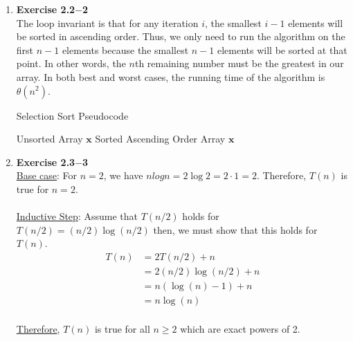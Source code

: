 \documentclass[a4paper,11pt,oneside]{book}
\begin{document}
\noindent{}
\normalsize

\begin{enumerate}
  \item {\textbf{Exercise 2.2$-$2}} 
  \\ The loop invariant is that for any iteration $i$, the smallest $i-1$ elements
  will be sorted in ascending order. Thus, we only need to run the algorithm on the first $n-1$
  elements because the smallest $n-1$ elements will be sorted at that point. In other words, the $n$th 
  remaining number must be the greatest in our array. In both best and worst cases, the running time of the
  algorithm is $\theta(n^2)$.
\begin{algorithm}
    \caption{Selection Sort Pseudocode}
    \begin{algorithmic}[1]
        \Require Unsorted Array $\mathbf{x}$
        \Ensure Sorted Ascending Order Array $\mathbf{x}$
        \Statex
            \EndIf
          \EndFor
        \EndFor
        \EndFunction
    \end{algorithmic}
\end{algorithm}

  \item {\textbf{Exercise 2.3$-$3}}
  \\ \underline{Base case}: For $n = 2$, we have $nlogn = 2\log2 = 2 \cdot 1 = 2$. Therefore, $T(n)$ is true for $n = 2$.
  \\
  \\ \underline{Inductive Step}: Assume that $T(n/2)$ holds for $T(n/2) = (n/2)\log(n/2)$ then, we must show that this holds for $T(n)$.
  \\
  \begin{align*}
    T(n) &= 2T(n/2) + n\\
    &= 2(n/2)\log(n/2) + n\\
    &= n(\log(n)-1) + n\\
    &= n\log(n)
  \end{align*}
  \\ \underline{Therefore}, $T(n)$ is true for all $n \geq 2$ which are exact powers of 2.
  

\end{enumerate}
\end{document}
